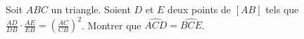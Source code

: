 Soit $ABC$ un triangle. Soient $D$ et $E$ deux points de $[AB]$ tels que $\frac{AD}{DB} \cdot \frac{AE}{EB} = \left(\frac{AC}{CB}\right)^2$. Montrer que $\widehat{ACD} = \widehat{BCE}$.
